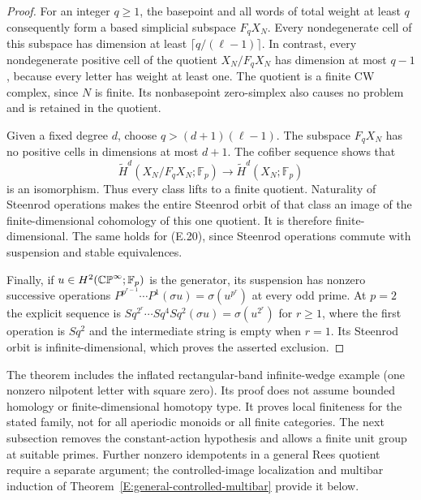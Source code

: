 \begin{proof}
For an integer $q\geq1$, the basepoint and all words of total weight
at least $q$ consequently form a based simplicial subspace $F_qX_N$.
Every nondegenerate cell of this subspace has dimension at least
$\lceil q/(\ell-1)\rceil$.  In contrast, every nondegenerate positive
cell of the quotient $X_N/F_qX_N$ has dimension at most $q-1$,
because every letter has weight at least one.  The quotient is a finite
CW complex, since $N$ is finite.  Its nonbasepoint zero-simplex also
causes no problem and is retained in the quotient.

Given a fixed degree $d$, choose $q>(d+1)(\ell-1)$.
The subspace $F_qX_N$ has no positive cells in dimensions at most
$d+1$.  The cofiber sequence shows that
\[
 \widetilde H^d(X_N/F_qX_N;\mathbb F_p)
     \longrightarrow\widetilde H^d(X_N;\mathbb F_p)
\]
is an isomorphism.  Thus every class lifts to a finite quotient.
Naturality of Steenrod operations makes the entire Steenrod orbit
of that class an image of the finite-dimensional cohomology of this
one quotient.  It is therefore finite-dimensional.  The same holds
for (E.20), since Steenrod operations commute with suspension and
stable equivalences.

Finally, if $u\in H^2(\mathbb {CP}^\infty;\mathbb F_p)$ is the generator,
its suspension has nonzero successive operations
$P^{p^{r-1}}\cdots P^1(\sigma u)=\sigma(u^{p^r})$
at every odd prime.  At $p=2$ the explicit sequence is
$Sq^{2^r}\cdots Sq^4 Sq^2(\sigma u)=\sigma(u^{2^r})$ for $r\geq1$,
where the first operation is $Sq^2$ and the intermediate string is
empty when $r=1$.  Its Steenrod orbit is infinite-dimensional,
which proves the asserted exclusion.
\end{proof}

\begin{remark}\label{E:nilpotent-inflations-scope}
The theorem includes the inflated rectangular-band infinite-wedge
example (one nonzero nilpotent letter with square zero).  Its proof
does not assume bounded homology or finite-dimensional homotopy type.
It proves local finiteness for the stated family, not for all aperiodic
monoids or all finite categories.  The next subsection removes the
constant-action hypothesis and allows a finite unit group at suitable
primes.  Further nonzero idempotents in a general Rees quotient
require a separate argument; the controlled-image localization and
multibar induction of Theorem~\ref{E:general-controlled-multibar}
provide it below.
\end{remark}
